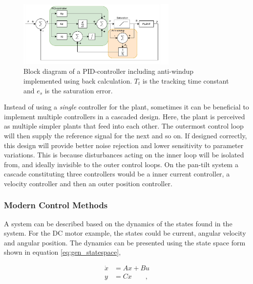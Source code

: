 \documentclass[../../main.tex]{subfiles}
\begin{document}
\begin{figure}
    \centering
    \includegraphics[width=0.7\textwidth]{Sections/Miscellaneous/Images/PID-Anti-windup-BackCalc.pdf}
    \caption{Block diagram of a PID-controller including anti-windup implemented using back calculation. $T_t$ is the tracking time constant and $e_s$ is the saturation error.}
    \label{fig:anti-windup}
\end{figure}

Instead of using a \textit{single} controller for the plant, sometimes it can be beneficial to implement multiple controllers in a cascaded design. %
Here, the plant is perceived as multiple simpler plants that feed into each other. The outermost control loop will then supply the reference signal for the next and so on. If designed correctly, this design will provide better noise rejection and lower sensitivity to parameter variations. This is because disturbances acting on the inner loop will be isolated from, and ideally invisible to the outer control loops. On the pan-tilt system a cascade constituting three controllers would be a inner current controller, a velocity controller and then an outer position controller.

\subsubsection*{Modern Control Methods}
A system can be described based on the dynamics of the states found in the system. For the DC motor example, the states could be current, angular velocity and angular position. The dynamics can be presented using the state space form shown in equation \ref{eq:gen_statespace},

\begin{equation}\label{eq:gen_statespace}
    \begin{split}
        \Dot{x}&=Ax+Bu \\
        y&=Cx \qquad ,%
    \end{split}
\end{equation}
\end{document}
